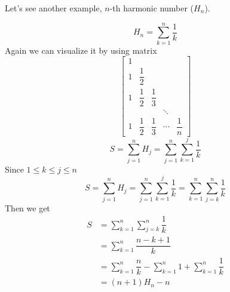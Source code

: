 Let's see another example, \(n\)-th harmonic number (\(H_n\)).

\begin{eg}
	\[
		H_n = \sum_{k = 1}^n \dfrac{1}{k}
	\]
	Again we can visualize it by using matrix
	\[
		\begin{bmatrix}
			1 &  &  &  &   \\
			1 & \dfrac{1}{2} &  &  &   \\
			1 & \dfrac{1}{2} & \dfrac{1}{3} &  &   \\
			  &  &  & \ddots &   \\
			1 & \dfrac{1}{2} & \dfrac{1}{3} & \cdots &\dfrac{1}{n}
		\end{bmatrix}
	\]
	\[
		S = \sum_{j = 1}^n H_j = \sum_{j = 1}^n  \sum_{k = 1}^j \dfrac{1}{k} 
	\]
	Since \(1 \leq k \leq j \leq n\) 
	\[
		S = \sum_{j = 1}^n H_j = \sum_{j = 1}^n  \sum_{k = 1}^j \dfrac{1}{k} = \sum_{k = 1}^n  \sum_{j = k}^n \dfrac{1}{k}
	\]
	Then we get
	\[
		\begin{aligned}
			S &= \sum_{k = 1}^n  \sum_{j = k}^n \dfrac{1}{k} \\
			&= \sum_{k = 1}^n \dfrac{n - k + 1}{k} \\
			&= \sum_{k = 1}^n \dfrac{n}{k} - \sum_{k = 1}^n 1 + \sum_{k = 1}^n \dfrac{1}{k} \\
			&= (n+1)H_n - n
		\end{aligned}
	\]
\end{eg}